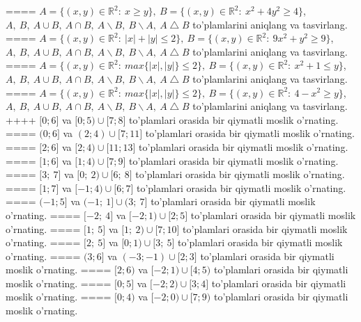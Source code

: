 ====
\(A = \{(x,y) \in \mathbb{R}^{2}:\ x \geq y\},\ B = \{(x,y) \in \mathbb{R}^{2}:\ x^{2} + 4y^{2} \geq 4\}\), \(A,\ B,\ A \cup B,\ A \cap B,\ A \backslash B,\ B \backslash A,\ A \bigtriangleup B\) to'plamlarini aniqlang va tasvirlang.
====
\(A = \{(x,y) \in \mathbb{R}^{2}:\ |x| + |y| \leq 2\},\ B = \{(x,y) \in \mathbb{R}^{2}:\ 9x^{2} + y^{2} \geq 9\}\),\(A,\ B,\ A \cup B,\ A \cap B,\ A \backslash B,\ B \backslash A,\ A \bigtriangleup B\) to'plamlarini aniqlang va tasvirlang.
====
\(A = \{(x,y) \in \mathbb{R}^{2}:\ max\{|x|,|y|\} \leq 2\},\ B = \{(x,y) \in \mathbb{R}^{2}:\ x^{2} + 1 \leq y\}\), \(A,\ B,\ A \cup B,\ A \cap B,\ A \backslash B,\ B \backslash A,\ A \bigtriangleup B\) to'plamlarini aniqlang va tasvirlang.
====
\(A = \{(x,y) \in \mathbb{R}^{2}:\ max\{|x|,|y|\} \leq 2\},\ B = \{(x,y) \in \mathbb{R}^{2}:\ 4 - x^{2} \geq y\}\), \(A,\ B,\ A \cup B,\ A \cap B,\ A \backslash B,\ B \backslash A,\ A \bigtriangleup B\) to'plamlarini aniqlang va tasvirlang.
++++
\(\lbrack 0;6\rbrack\) va \(\lbrack 0;5) \cup \lbrack 7;8\rbrack\) to'plamlari orasida bir qiymatli moslik o'rnating.
====
\((0;6\rbrack\) va \((2;4) \cup \lbrack 7;11\rbrack\) to'plamlari orasida bir qiymatli moslik o'rnating.
====
\(\lbrack 2;6\rbrack\) va \(\lbrack 2;4) \cup \lbrack 11;13\rbrack\) to'plamlari orasida bir qiymatli moslik o'rnating.
====
\(\lbrack 1;6\rbrack\) va \(\lbrack 1;4) \cup \lbrack 7;9\rbrack\) to'plamlari orasida bir qiymatli moslik o'rnating.
====
\(\lbrack 3;\ 7\rbrack\) va \(\lbrack 0;\ 2) \cup \lbrack 6;\ 8\rbrack\) to'plamlari orasida bir qiymatli moslik o'rnating.
====
\(\lbrack 1;7\rbrack\) va \(\lbrack - 1;4) \cup \lbrack 6;7\rbrack\) to'plamlari orasida bir qiymatli moslik o'rnating.
====
\(( - 1;5\rbrack\) va \(( - 1;\ 1\rbrack \cup (3;\ 7\rbrack\) to'plamlari orasida bir qiymatli moslik o'rnating.
====
\(\lbrack - 2;\ 4\rbrack\) va \(\lbrack - 2;1) \cup \lbrack 2;5\rbrack\) to'plamlari orasida bir qiymatli moslik o'rnating.
====
\(\lbrack 1;\ 5\rbrack\) va \(\lbrack 1;\ 2) \cup \lbrack 7;10\rbrack\) to'plamlari orasida bir qiymatli moslik o'rnating.
====
\(\lbrack 2;\ 5\rbrack\) va \(\lbrack 0;1) \cup \lbrack 3;\ 5\rbrack\) to'plamlari orasida bir qiymatli moslik o'rnating.
====
\((3;6\rbrack\) va \(( - 3; - 1) \cup \lbrack 2;3\rbrack\) to'plamlari orasida bir qiymatli moslik o'rnating.
====
\(\lbrack 2;6)\) va \(\lbrack - 2;1) \cup \lbrack 4;5)\) to'plamlari orasida bir qiymatli moslik o'rnating.
====
\(\lbrack 0;5\rbrack\) va \(\lbrack - 2;2) \cup \lbrack 3;4\rbrack\) to'plamlari orasida bir qiymatli moslik o'rnating.
====
\(\lbrack 0;4)\) va \(\lbrack - 2;0) \cup \lbrack 7;9)\) to'plamlari orasida bir qiymatli moslik o'rnating.
